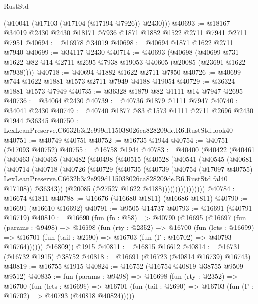 \begin{lexlean}{RustStd}
\begin{coremodule}
      (@10041 (@17103 (@17104 (@17194 @7926)) @2430)))
@40693 := @18167 @34019 @2430 @2430 @18171 @7936 @1871 @1882 @1622 @2711 @7941 @2711 @7951
@40694 := @16978 @34019
@40698 := @40694 @1871 @1622 @2711 @7940
@40699 := @34117 @2430
@40714 := @40693
    (@40698
      (@40699 @731 @1622 @82 @14 @2711 @2695 @7938 @19053 @40605 (@20085 (@23691 @1622 @7938))))
@40718 := @40694 @1882 @1622 @2711 @7950
@40726 := @40699 @744 @1622 @1881 @1573 @2711 @7949 @4188 @19054
@40729 := @36324 @1881 @1573 @7949
@40735 := @36328 @1879 @82 @1111 @14 @7947 @2695
@40736 := @34064 @2430
@40739 := @40736 @1879 @1111 @7947
@40740 := @34041 @2430
@40749 := @40740 @1877 @83 @1573 @1111 @2711 @2696 @2430 @1944 @36345
@40750 := LexLeanPreserve.C6632b3a2e999d115038026ca828209de.R6.RustStd.look40
@40751 := @40749 @40750
@40752 := @16735 @1944
@40754 := @40751 (@17093 @40752)
@40755 := @16758 @1944
@40783 := @40400
    (@40422
      (@40461
        (@40463
          (@40465
            (@40482
              (@40498
                (@40515
                  (@40528
                    (@40541
                      (@40545
                        (@40681
                          (@40714
                            (@40718
                              (@40726
                                (@40729
                                  (@40735
                                    (@40739
                                      (@40754
                                        (@17097 @40755)
                                        LexLeanPreserve.C6632b3a2e999d115038026ca828209de.R6.RustStd.fal40
                                        @17108))
                                    @36343))
                                (@20085 (@27527 @1622 @4188))))))))))))))))
@40784 := @16674 @1811
@40788 := @16676 (@16680 @1811) (@16686 @1811)
@40790 := @16691 (@16610 @16692)
@40791 := @9505 @14737
@40793 := @16691 (@40791 @16719)
@40810 := @16690
    (fun (fn : @58) =>
    @40790
      (@16695
        (@16697
          (fun (params : @9498) =>
          @16698
            (fun (rty : @2352) =>
            @16700
              (fun (lets : @16699) =>
              @16701 (fun (tail : @2690) => @16703 (fun (Γ : @16702) => @40793 @16764))))))
        @16809))
    @1915
@40811 := @16815 @16612
@40814 := @16731 (@16732 @1915) @38752
@40818 := @16691 (@16723 (@40814 @16739) @16743)
@40819 := @16755 @1915
@40824 := @16752 (@16754 @40819 @38755 @9509 @9512)
@40835 := fun (params : @9498) =>
  @16698
    (fun (rty : @2352) =>
    @16700
      (fun (lets : @16699) =>
      @16701 (fun (tail : @2690) => @16703 (fun (Γ : @16702) => @40793 (@40818 @40824)))))

\end{coremodule}
\end{lexlean}
